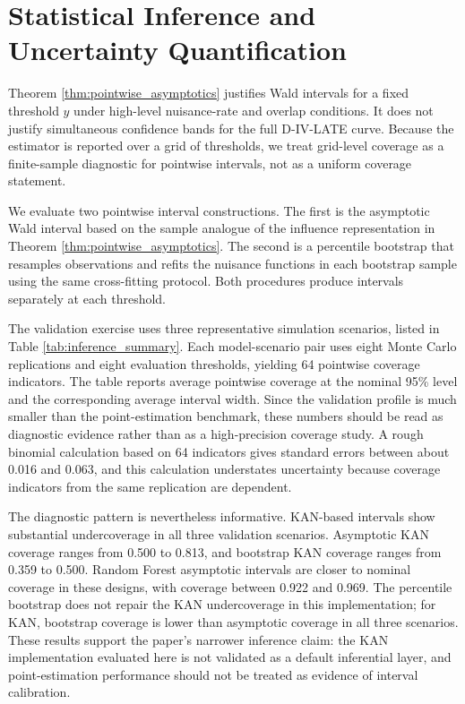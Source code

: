 \documentclass[final,3p,fleqn, 10pt]{elsarticle}
\begin{document}
\section{Statistical Inference and Uncertainty Quantification}
\label{sec:inference}

Theorem \ref{thm:pointwise_asymptotics} justifies Wald intervals for a fixed threshold $y$ under high-level nuisance-rate and overlap conditions. It does not justify simultaneous confidence bands for the full D-IV-LATE curve. Because the estimator is reported over a grid of thresholds, we treat grid-level coverage as a finite-sample diagnostic for pointwise intervals, not as a uniform coverage statement.

We evaluate two pointwise interval constructions. The first is the asymptotic Wald interval based on the sample analogue of the influence representation in Theorem \ref{thm:pointwise_asymptotics}. The second is a percentile bootstrap that resamples observations and refits the nuisance functions in each bootstrap sample using the same cross-fitting protocol. Both procedures produce intervals separately at each threshold.

The validation exercise uses three representative simulation scenarios, listed in Table \ref{tab:inference_summary}. Each model-scenario pair uses eight Monte Carlo replications and eight evaluation thresholds, yielding 64 pointwise coverage indicators. The table reports average pointwise coverage at the nominal 95\% level and the corresponding average interval width. Since the validation profile is much smaller than the point-estimation benchmark, these numbers should be read as diagnostic evidence rather than as a high-precision coverage study. A rough binomial calculation based on 64 indicators gives standard errors between about 0.016 and 0.063, and this calculation understates uncertainty because coverage indicators from the same replication are dependent.

The diagnostic pattern is nevertheless informative. KAN-based intervals show substantial undercoverage in all three validation scenarios. Asymptotic KAN coverage ranges from 0.500 to 0.813, and bootstrap KAN coverage ranges from 0.359 to 0.500. Random Forest asymptotic intervals are closer to nominal coverage in these designs, with coverage between 0.922 and 0.969. The percentile bootstrap does not repair the KAN undercoverage in this implementation; for KAN, bootstrap coverage is lower than asymptotic coverage in all three scenarios. These results support the paper's narrower inference claim: the KAN implementation evaluated here is not validated as a default inferential layer, and point-estimation performance should not be treated as evidence of interval calibration.
\end{document}
